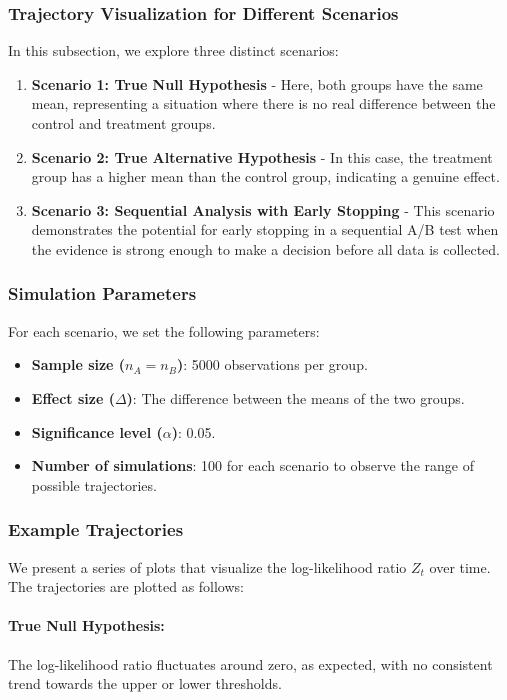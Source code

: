 \documentclass[magisterska, english]{pwr_wmat_praca_dyplomowa}
\theoremstyle{plain}
\numberwithin{theorem}{chapter}
\theoremstyle{definition}
\numberwithin{theorem}{chapter}
\begin{document}
\subsubsection{Trajectory Visualization for Different Scenarios}

In this subsection, we explore three distinct scenarios:
\begin{enumerate}
	\item \textbf{Scenario 1: True Null Hypothesis} - Here, both groups have the same mean, representing a situation where there is no real difference between the control and treatment groups.
	\item \textbf{Scenario 2: True Alternative Hypothesis} - In this case, the treatment group has a higher mean than the control group, indicating a genuine effect.
	\item \textbf{Scenario 3: Sequential Analysis with Early Stopping} - This scenario demonstrates the potential for early stopping in a sequential A/B test when the evidence is strong enough to make a decision before all data is collected.
\end{enumerate}

\subsubsection{Simulation Parameters}

For each scenario, we set the following parameters:
\begin{itemize}
	\item \textbf{Sample size (\(n_A = n_B\))}: 5000 observations per group.
	\item \textbf{Effect size (\(\Delta\))}: The difference between the means of the two groups.
	\item \textbf{Significance level (\(\alpha\))}: 0.05.
	\item \textbf{Number of simulations}: 100 for each scenario to observe the range of possible trajectories.
\end{itemize}

\subsubsection{Example Trajectories}

We present a series of plots that visualize the log-likelihood ratio \(Z_t\) over time. The trajectories are plotted as follows:

\paragraph{True Null Hypothesis:}
The log-likelihood ratio fluctuates around zero, as expected, with no consistent trend towards the upper or lower thresholds.
\end{document}
